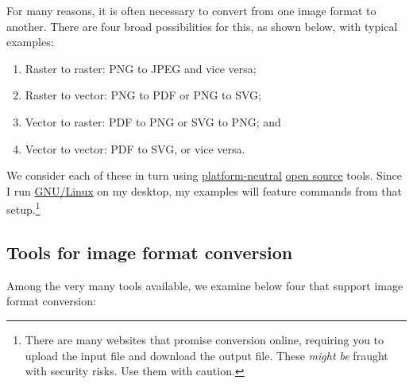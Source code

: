 \documentclass[
  a4paper,
]{article}
\providecommand{\tightlist}{%
  \setlength{\itemsep}{0pt}\setlength{\parskip}{0pt}}
\begin{document}
For many reasons, it is often necessary to convert from one image format
to another. There are four broad possibilities for this, as shown below,
with typical examples:

\begin{enumerate}
\tightlist
\item
  Raster to raster: PNG to JPEG and vice versa;
\item
  Raster to vector: PNG to PDF or PNG to SVG;
\item
  Vector to raster: PDF to PNG or SVG to PNG; and
\item
  Vector to vector: PDF to SVG, or vice versa.
\end{enumerate}

We consider each of these in turn using
\href{https://itlaw.wikia.org/wiki/Platform_neutral}{platform-neutral}
\href{https://opensource.com/resources/what-open-source}{open source}
tools. Since I run
\href{https://en.wikipedia.org/wiki/GNU/Linux_naming_controversy}{GNU/Linux}
on my desktop, my examples will feature commands from that
setup.\footnote{There are many websites that promise conversion online,
  requiring you to upload the input file and download the output file.
  These \emph{might be} fraught with security risks. Use them with
  caution.}

\hypertarget{tools-for-image-format-conversion}{%
\subsection{Tools for image format
conversion}\label{tools-for-image-format-conversion}}

Among the very many tools available, we examine below four that support
image format conversion:
\end{document}
